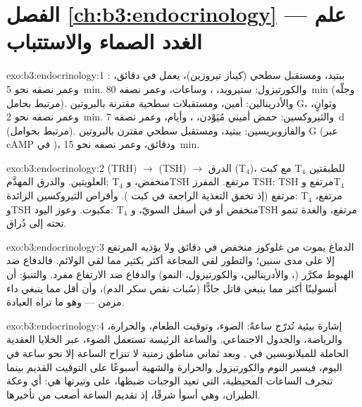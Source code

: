 \section*{الفصل \ref{ch:b3:endocrinology} --- علم الغدد الصماء والاستتباب}

\begin{solution}{exo:b3:endocrinology:1}
: ببتيد، ومستقبل سطحي (كيناز تيروزين)، يعمل في
دقائق، وعمر نصفه نحو \qty{5}{min}. والكورتيزول: ستيرويد،
، وساعات، وعمر نصفه \qty{80}{min} (وجلّه مرتبط
بحامل). والأدرينالين: أمين، ومستقبلات سطحية مقترنة بالبروتين
G، وثوانٍ، وعمر نصفه نحو \qty{2}{min}. والثيروكسين: حمض أميني
مُيَوْدن، ، وأيام، وعمر نصفه \qty{7}{d} (مرتبط
بحوامل). والفازوبريسين: ببتيد، ومستقبل سطحي مقترن بالبروتين
G (عبر cAMP في )، ودقائق، وعمر نصفه نحو
\qty{15}{min}.
\end{solution}

\begin{solution}{exo:b3:endocrinology:2}
 (TRH) $\to$  (TSH) $\to$ الدرق (T$_{4}$)، مع
كبت T$_{4}$ للطبقتين العلويتين. والدرق المهدَّم: T$_{4}$
منخفض، وTSH مرتفع.  المفرز  TSH: TSH مرتفع وT$_{4}$
مرتفع (إذ تخفق التغذية الراجعة في كبت ). وأقراص
الثيروكسين الزائدة: T$_{4}$ مرتفع، وTSH مكبوت. وعوز اليود:
T$_{4}$ منخفض أو في أسفل السويّ، وTSH مرتفع، والغدة تنمو تحته
إلى دُراق.
\end{solution}

\begin{solution}{exo:b3:endocrinology:3}
الدماغ يموت من غلوكوز منخفض في دقائق ولا يؤذيه المرتفع إلا
على مدى سنين؛ والتطور لقي المجاعة أكثر بكثير مما لقي الولائم.
فالدفاع ضد الهبوط مكرَّر (، والأدرينالين،
والكورتيزول،  النمو) والدفاع ضد الارتفاع مفرد. والتنبؤ:
أن أنسولينًا أكثر مما ينبغي قاتل حادًّا (سُبات نقص سكر
الدم)، وأن أقل مما ينبغي داء مزمن --- وهو ما تراه العيادة.
\end{solution}

\begin{solution}{exo:b3:endocrinology:4}
 إشارة بيئية تُدرّج ساعةً: الضوء، وتوقيت الطعام،
والحرارة، والرياضة، والجدول الاجتماعي. والساعة الرئيسة
تستعمل الضوء، عبر الخلايا العقدية الحاملة للميلانوبسين في
. وبعد ثماني مناطق زمنية لا تنزاح الساعة إلا نحو
ساعة في اليوم، فيسير النوم والكورتيزول والحرارة والشهية
أسبوعًا على التوقيت القديم بينما تنجرف الساعات المحيطية،
التي تعيد الوجبات ضبطها، على وتيرتها هي: أي وعكة الطيران،
وهي أسوأ شرقًا، إذ تقديم الساعة أصعب من تأخيرها.
\end{solution}

